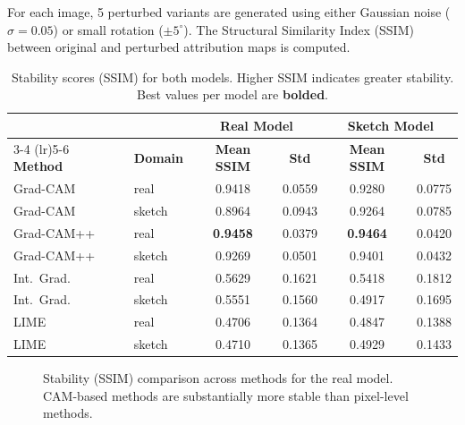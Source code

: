 \documentclass[12pt, a4paper]{article}
\begin{document}
For each image, 5 perturbed variants are generated using either Gaussian noise
($\sigma = 0.05$) or small rotation ($\pm 5^{\circ}$).  The Structural Similarity
Index (SSIM) between original and perturbed attribution maps is computed.

\begin{table}[H]
\centering
\caption{Stability scores (SSIM) for both models.  Higher SSIM indicates
greater stability.  Best values per model are \textbf{bolded}.}
\label{tab:stability}
\begin{tabular}{llcccc}
\toprule
& & \multicolumn{2}{c}{\textbf{Real Model}} & \multicolumn{2}{c}{\textbf{Sketch Model}} \\
\cmidrule(lr){3-4} \cmidrule(lr){5-6}
\textbf{Method} & \textbf{Domain} & \textbf{Mean SSIM} & \textbf{Std}
& \textbf{Mean SSIM} & \textbf{Std} \\
\midrule
Grad-CAM   & real   & 0.9418 & 0.0559 & 0.9280 & 0.0775 \\
Grad-CAM   & sketch & 0.8964 & 0.0943 & 0.9264 & 0.0785 \\
Grad-CAM++ & real   & \textbf{0.9458} & 0.0379 & \textbf{0.9464} & 0.0420 \\
Grad-CAM++ & sketch & 0.9269 & 0.0501 & 0.9401 & 0.0432 \\
Int.~Grad. & real   & 0.5629 & 0.1621 & 0.5418 & 0.1812 \\
Int.~Grad. & sketch & 0.5551 & 0.1560 & 0.4917 & 0.1695 \\
LIME       & real   & 0.4706 & 0.1364 & 0.4847 & 0.1388 \\
LIME       & sketch & 0.4710 & 0.1365 & 0.4929 & 0.1433 \\
\bottomrule
\end{tabular}
\end{table}

\begin{figure}[H]
\centering
{}
\caption{Stability (SSIM) comparison across methods for the real model.
CAM-based methods are substantially more stable than pixel-level methods.}
\label{fig:stability_real}
\end{figure}
\end{document}
